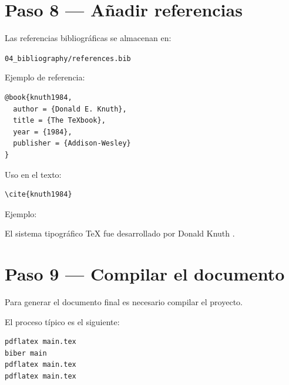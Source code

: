 
\section{Paso 8 — Añadir referencias}

Las referencias bibliográficas se almacenan en:

\texttt{04\_bibliography/references.bib}



Ejemplo de referencia:

\begin{lstlisting}[caption={Referencia BibTeX},label={code:bib}]
@book{knuth1984,
  author = {Donald E. Knuth},
  title = {The TeXbook},
  year = {1984},
  publisher = {Addison-Wesley}
}
\end{lstlisting}




Uso en el texto:

\begin{lstlisting}[caption={Citar referencia},label={code:cite}]
\cite{knuth1984}
\end{lstlisting}




Ejemplo:

\begin{examplebox}
El sistema tipográfico \TeX{} fue desarrollado por
Donald Knuth \cite{knuth1984}.
\end{examplebox}




\section{Paso 9 — Compilar el documento}

Para generar el documento final es necesario compilar
el proyecto.

El proceso típico es el siguiente:

\begin{lstlisting}[caption={Proceso de compilación},label={code:compile}]
pdflatex main.tex
biber main
pdflatex main.tex
pdflatex main.tex
\end{lstlisting}

